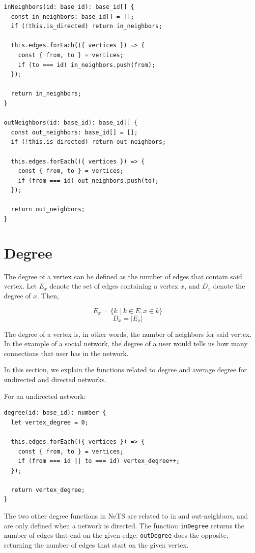 \begin{verbatim}
inNeighbors(id: base_id): base_id[] {
  const in_neighbors: base_id[] = [];
  if (!this.is_directed) return in_neighbors;

  this.edges.forEach(({ vertices }) => {
    const { from, to } = vertices;
    if (to === id) in_neighbors.push(from);
  });

  return in_neighbors;
}

outNeighbors(id: base_id): base_id[] {
  const out_neighbors: base_id[] = [];
  if (!this.is_directed) return out_neighbors;

  this.edges.forEach(({ vertices }) => {
    const { from, to } = vertices;
    if (from === id) out_neighbors.push(to);
  });

  return out_neighbors;
}
\end{verbatim}

\section{Degree}

The degree of a vertex can be defined as the number of edges that contain said vertex.
Let $E_x$ denote the set of edges containing a vertex $x$, and $D_x$ denote
the degree of $x$. Then,

$$E_x=\{k \mid k \in E, x \in k\}$$
$$D_x=|E_x|$$

The degree of a vertex is, in other words, the number of neighbors for said vertex.
In the example of a social network, the degree of a user would
tells us how many connections that user has in the network.

In this section, we explain the functions related to degree and average degree
for undirected and directed networks.

For an undirected network:

\begin{verbatim}
degree(id: base_id): number {
  let vertex_degree = 0;

  this.edges.forEach(({ vertices }) => {
    const { from, to } = vertices;
    if (from === id || to === id) vertex_degree++;
  });

  return vertex_degree;
}
\end{verbatim}

The two other degree functions in NeTS are related to in and out-neighbors,
and are only defined when a network is directed.
The function \texttt{inDegree} returns the number of edges that end on the given edge.
\texttt{outDegree} does the opposite,
returning the number of edges that start on the given vertex.

